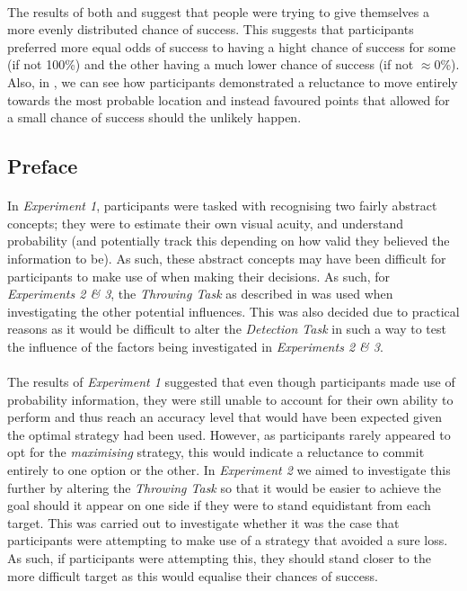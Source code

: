 \documentclass[12pt]{article}
\begin{document}
\paragraph{} The results of both \cite{CHAPMAN2010168} and \cite{Hudson2007probmove} suggest that people were trying to give themselves a more evenly distributed chance of success. This suggests that participants preferred more equal odds of success to having a hight chance of success for some (if not 100\%) and the other having a much lower chance of success (if not $\approx$0\%). Also, in \cite{Hudson2007probmove}, we can see how participants demonstrated a reluctance to move entirely towards the most probable location and instead favoured points that allowed for a small chance of success should the unlikely happen.

\subsection*{Preface}
\paragraph{} In \textit{Experiment 1}, participants were tasked with recognising two fairly abstract concepts; they were to estimate their own visual acuity, and understand probability (and potentially track this depending on how valid they believed the information to be). As such, these abstract concepts may have been difficult for participants to make use of when making their decisions. As such, for \textit{Experiments 2 \& 3}, the \textit{Throwing Task} as described in \cite{clarke2015failure} was used when investigating the other potential influences. This was also decided due to practical reasons as it would be difficult to alter the \textit{Detection Task} in such a way to test the influence of the factors being investigated in \textit{Experiments 2 \& 3}. 

\paragraph{} The results of \textit{Experiment 1} suggested that even though participants made use of probability information, they were still unable to account for their own ability to perform and thus reach an accuracy level that would have been expected given the optimal strategy had been used. However, as participants rarely appeared to opt for the \textit{maximising} strategy, this would indicate a reluctance to commit entirely to one option or the other. In \textit{Experiment 2} we aimed to investigate this further by altering the \textit{Throwing Task} \citep{clarke2015failure} so that it would be easier to achieve the goal should it appear on one side if they were to stand equidistant from each target. This was carried out to investigate whether it was the case that participants were attempting to make use of a strategy that avoided a sure loss. As such, if participants were attempting this, they should stand closer to the more difficult target as this would equalise their chances of success. 
 
\end{document}
